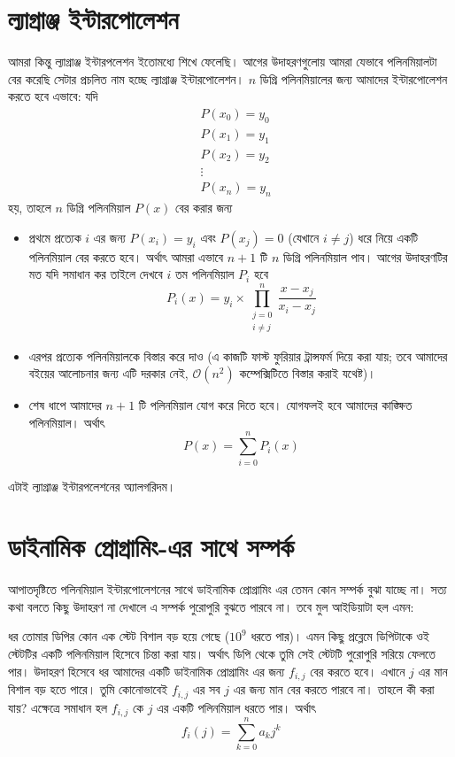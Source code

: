 \section{ল্যাগ্রাঞ্জ ইন্টারপোলেশন}
আমরা কিন্তু ল্যাগ্রাঞ্জ ইন্টারপলেশন ইতোমধ্যে শিখে ফেলেছি। আগের উদাহরণগুলোয় আমরা যেভাবে পলিনমিয়ালটা বের করেছি সেটার প্রচলিত নাম হচ্ছে ল্যাগ্রাঞ্জ ইন্টারপোলেশন। $n$ ডিগ্রি পলিনমিয়ালের জন্য আমাদের ইন্টারপোলেশন করতে হবে এভাবে: যদি
\begin{align*}
&P(x_0) = y_0 \\
&P(x_1) = y_1 \\
&P(x_2) = y_2 \\
&\vdots \\
&P(x_n) = y_n
\end{align*}
হয়, তাহলে $n$ ডিগ্রি পলিনমিয়াল $P(x)$ বের করার জন্য 
\begin{itemize}
\item প্রথমে প্রত্যেক $i$ এর জন্য $P(x_i) = y_i$ এবং $P(x_j) = 0$ (যেখানে $i \neq j$) ধরে নিয়ে একটি পলিনমিয়াল বের করতে হবে। অর্থাৎ আমরা এভাবে $n + 1$ টি $n$ ডিগ্রি পলিনমিয়াল পাব। আগের উদাহরণটির মত যদি সমাধান কর তাইলে দেখবে $i$ তম পলিনমিয়াল $P_i$ হবে
$$P_{i}(x) = y_{i} \times \prod_{\substack{j = 0 \\ i \neq j}}^n \frac{x - x_j}{x_i - x_j}$$
\item এরপর প্রত্যেক পলিনমিয়ালকে বিস্তার করে দাও (এ কাজটি ফাস্ট ফুরিয়ার ট্রান্সফর্ম দিয়ে করা যায়; তবে আমাদের বইয়ের আলোচনার জন্য এটি দরকার নেই, $\mathcal{O}(n^2)$ কম্পেক্সিটিতে বিস্তার করাই যথেষ্ট)।
\item শেষ ধাপে আমাদের $n + 1$ টি পলিনমিয়াল যোগ করে দিতে হবে।  যোগফলই হবে আমাদের কাঙ্ক্ষিত পলিনমিয়াল। অর্থাৎ 
$$P(x) = \sum_{i=0}^{n} P_i(x)$$
\end{itemize}
এটাই ল্যাগ্রাঞ্জ ইন্টারপলেশনের অ্যালগরিদম। 

\section{ডাইনামিক প্রোগ্রামিং-এর সাথে সম্পর্ক}
আপাতদৃষ্টিতে পলিনমিয়াল ইন্টারপোলেশনের সাথে ডাইনামিক প্রোগ্রামিং এর তেমন কোন সম্পর্ক বুঝা যাচ্ছে না। সত্য কথা বলতে কিছু উদাহরণ না দেখালে এ সম্পর্ক পুরোপুরি বুঝতে পারবে না। তবে মুল আইডিয়াটা হল এমন:

ধর তোমার ডিপির কোন এক স্টেট বিশাল বড় হয়ে গেছে ($10^9$ ধরতে পার)। এমন কিছু প্রব্লেমে ডিপিটাকে ওই স্টেটটির একটি পলিনমিয়াল হিসেবে চিন্তা করা যায়। অর্থাৎ ডিপি থেকে তুমি সেই স্টেটটি পুরোপুরি সরিয়ে ফেলতে পার। উদাহরণ হিসেবে ধর আমাদের একটি ডাইনামিক প্রোগ্রামিং এর জন্য $f_{i, j}$ বের করতে হবে। এখানে $j$ এর মান বিশাল বড় হতে পারে। তুমি কোনোভাবেই $f_{i, j}$ এর সব $j$ এর জন্য মান বের করতে পারবে না। তাহলে কী করা যায়? 
এক্ষেত্রে সমাধান হল $f_{i, j}$ কে $j$ এর একটি পলিনমিয়াল ধরতে পার। অর্থাৎ 
$$f_{i}(j) = \sum_{k = 0}^{n} a_{k} j^{k}$$

